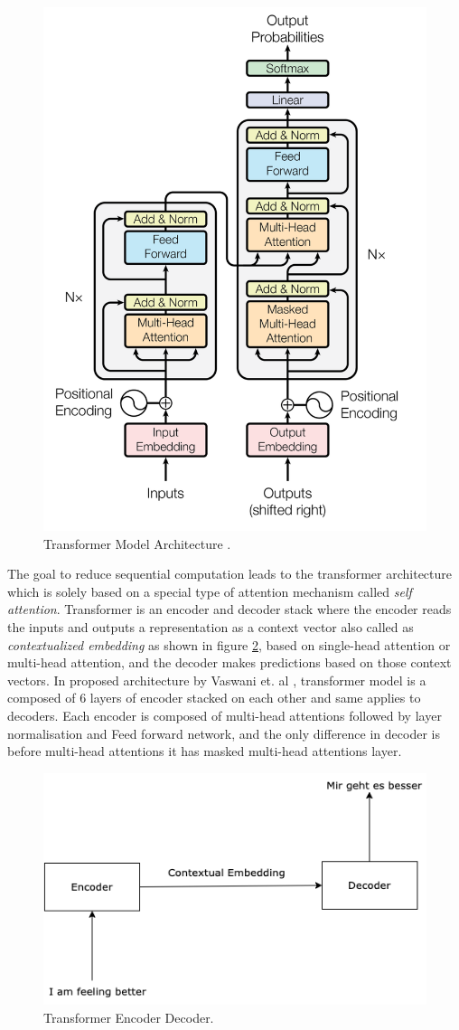 \documentclass[%
	BCOR=8mm, %
	DIV=12, 
	toc=bibliography, %
	toc=listof, %
	oneside, %
	egregdoesnotlikesansseriftitles, %
	]{scrbook}
\begin{document}
\begin{figure}[h!]
\centering
\includegraphics[width=.50\textwidth]{img/TransformerArchitecture.png}
\caption[Transformer Architecture]{Transformer Model Architecture \cite{vaswani_attention_2017}.}
\label{diag:TransformerArchitecture}
\end{figure}

The goal to reduce sequential computation leads to the transformer architecture which is solely based on a special type of attention mechanism called \textit{self attention}. Transformer is an encoder and decoder stack where the encoder reads the inputs and outputs a representation as a context vector also called as \textit{contextualized embedding} as shown in figure \ref{diag:EncoderDecoder}, based 
on single-head attention or multi-head attention, and the decoder makes predictions based on those context vectors. In proposed architecture by Vaswani et. al \cite{vaswani_attention_2017}, 
transformer model is a composed of 6 layers of encoder stacked on each other and same applies to decoders.  Each encoder is composed of multi-head attentions followed by layer normalisation and Feed forward network, and the only difference in decoder is before multi-head attentions it has masked multi-head attentions layer. 

\begin{figure}[h!]
\centering
\includegraphics[width=.50\textwidth]{img/encoderDecoder.png}
\caption[Encoder Decoder]{Transformer Encoder Decoder.}
\label{diag:EncoderDecoder}
\end{figure}
\end{document}
